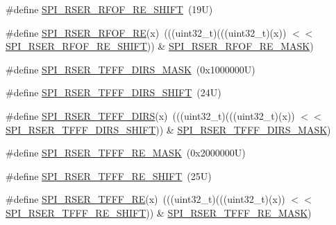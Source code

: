 \begin{DoxyCompactItemize}
\item 
\#define \mbox{\hyperlink{group___s_p_i___register___masks_gab18f888cf02c471809ebc9f807711a13}{S\+P\+I\+\_\+\+R\+S\+E\+R\+\_\+\+R\+F\+O\+F\+\_\+\+R\+E\+\_\+\+S\+H\+I\+FT}}~(19\+U)
\item 
\#define \mbox{\hyperlink{group___s_p_i___register___masks_ga23fe74057428ef330f653fe2115d270b}{S\+P\+I\+\_\+\+R\+S\+E\+R\+\_\+\+R\+F\+O\+F\+\_\+\+RE}}(x)~(((uint32\+\_\+t)(((uint32\+\_\+t)(x)) $<$$<$ \mbox{\hyperlink{group___s_p_i___register___masks_gab18f888cf02c471809ebc9f807711a13}{S\+P\+I\+\_\+\+R\+S\+E\+R\+\_\+\+R\+F\+O\+F\+\_\+\+R\+E\+\_\+\+S\+H\+I\+FT}})) \& \mbox{\hyperlink{group___s_p_i___register___masks_ga32d8083bb571fb12a424b1803c596f47}{S\+P\+I\+\_\+\+R\+S\+E\+R\+\_\+\+R\+F\+O\+F\+\_\+\+R\+E\+\_\+\+M\+A\+SK}})
\item 
\#define \mbox{\hyperlink{group___s_p_i___register___masks_ga01228112dcc4440aa1678eb55b97306e}{S\+P\+I\+\_\+\+R\+S\+E\+R\+\_\+\+T\+F\+F\+F\+\_\+\+D\+I\+R\+S\+\_\+\+M\+A\+SK}}~(0x1000000\+U)
\item 
\#define \mbox{\hyperlink{group___s_p_i___register___masks_ga9f1684fdb2e7f9e9adb7afd07a3278da}{S\+P\+I\+\_\+\+R\+S\+E\+R\+\_\+\+T\+F\+F\+F\+\_\+\+D\+I\+R\+S\+\_\+\+S\+H\+I\+FT}}~(24\+U)
\item 
\#define \mbox{\hyperlink{group___s_p_i___register___masks_gacec859c23755e68e8b6ca6ee2d42cec4}{S\+P\+I\+\_\+\+R\+S\+E\+R\+\_\+\+T\+F\+F\+F\+\_\+\+D\+I\+RS}}(x)~(((uint32\+\_\+t)(((uint32\+\_\+t)(x)) $<$$<$ \mbox{\hyperlink{group___s_p_i___register___masks_ga9f1684fdb2e7f9e9adb7afd07a3278da}{S\+P\+I\+\_\+\+R\+S\+E\+R\+\_\+\+T\+F\+F\+F\+\_\+\+D\+I\+R\+S\+\_\+\+S\+H\+I\+FT}})) \& \mbox{\hyperlink{group___s_p_i___register___masks_ga01228112dcc4440aa1678eb55b97306e}{S\+P\+I\+\_\+\+R\+S\+E\+R\+\_\+\+T\+F\+F\+F\+\_\+\+D\+I\+R\+S\+\_\+\+M\+A\+SK}})
\item 
\#define \mbox{\hyperlink{group___s_p_i___register___masks_ga1bb1c8b3d77e69e8ea3197b2a26392cb}{S\+P\+I\+\_\+\+R\+S\+E\+R\+\_\+\+T\+F\+F\+F\+\_\+\+R\+E\+\_\+\+M\+A\+SK}}~(0x2000000\+U)
\item 
\#define \mbox{\hyperlink{group___s_p_i___register___masks_ga6b7e6d97146fb2244a8b1fb870cf980b}{S\+P\+I\+\_\+\+R\+S\+E\+R\+\_\+\+T\+F\+F\+F\+\_\+\+R\+E\+\_\+\+S\+H\+I\+FT}}~(25\+U)
\item 
\#define \mbox{\hyperlink{group___s_p_i___register___masks_ga57eacd49a756b99850d51f17e5d80475}{S\+P\+I\+\_\+\+R\+S\+E\+R\+\_\+\+T\+F\+F\+F\+\_\+\+RE}}(x)~(((uint32\+\_\+t)(((uint32\+\_\+t)(x)) $<$$<$ \mbox{\hyperlink{group___s_p_i___register___masks_ga6b7e6d97146fb2244a8b1fb870cf980b}{S\+P\+I\+\_\+\+R\+S\+E\+R\+\_\+\+T\+F\+F\+F\+\_\+\+R\+E\+\_\+\+S\+H\+I\+FT}})) \& \mbox{\hyperlink{group___s_p_i___register___masks_ga1bb1c8b3d77e69e8ea3197b2a26392cb}{S\+P\+I\+\_\+\+R\+S\+E\+R\+\_\+\+T\+F\+F\+F\+\_\+\+R\+E\+\_\+\+M\+A\+SK}})
$$
\end{DoxyCompactItemize}
